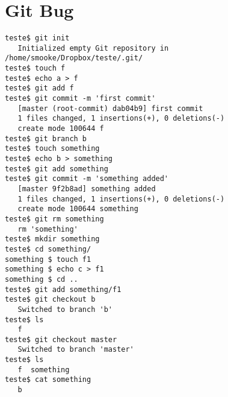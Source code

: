 \chapter{Git Bug}
\label{bugappend}
\begin{lstlisting}
teste$ git init
   Initialized empty Git repository in /home/smooke/Dropbox/teste/.git/
teste$ touch f
teste$ echo a > f
teste$ git add f
teste$ git commit -m 'first commit'
   [master (root-commit) dab04b9] first commit
   1 files changed, 1 insertions(+), 0 deletions(-)
   create mode 100644 f
teste$ git branch b
teste$ touch something
teste$ echo b > something
teste$ git add something
teste$ git commit -m 'something added'
   [master 9f2b8ad] something added
   1 files changed, 1 insertions(+), 0 deletions(-)
   create mode 100644 something
teste$ git rm something
   rm 'something'
teste$ mkdir something
teste$ cd something/
something $ touch f1
something $ echo c > f1
something $ cd ..
teste$ git add something/f1
teste$ git checkout b
   Switched to branch 'b'
teste$ ls
   f
teste$ git checkout master
   Switched to branch 'master'
teste$ ls
   f  something
teste$ cat something
   b
\end{lstlisting}

